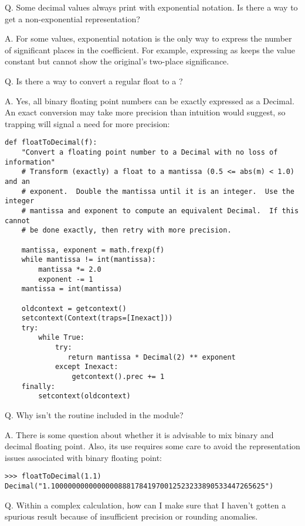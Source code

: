 Q.  Some decimal values always print with exponential notation.  Is there
a way to get a non-exponential representation?

A.  For some values, exponential notation is the only way to express
the number of significant places in the coefficient.  For example,
expressing  as  keeps the value
constant but cannot show the original's two-place significance.


Q.  Is there a way to convert a regular float to a ?

A.  Yes, all binary floating point numbers can be exactly expressed as a
Decimal.  An exact conversion may take more precision than intuition would
suggest, so trapping  will signal a need for more precision:

\begin{verbatim}
def floatToDecimal(f):
    "Convert a floating point number to a Decimal with no loss of information"
    # Transform (exactly) a float to a mantissa (0.5 <= abs(m) < 1.0) and an
    # exponent.  Double the mantissa until it is an integer.  Use the integer
    # mantissa and exponent to compute an equivalent Decimal.  If this cannot
    # be done exactly, then retry with more precision.

    mantissa, exponent = math.frexp(f)
    while mantissa != int(mantissa):
        mantissa *= 2.0
        exponent -= 1
    mantissa = int(mantissa)

    oldcontext = getcontext()
    setcontext(Context(traps=[Inexact]))
    try:
        while True:
            try:
               return mantissa * Decimal(2) ** exponent
            except Inexact:
                getcontext().prec += 1
    finally:
        setcontext(oldcontext)
\end{verbatim}


Q.  Why isn't the  routine included in the module?

A.  There is some question about whether it is advisable to mix binary and
decimal floating point.  Also, its use requires some care to avoid the
representation issues associated with binary floating point:

\begin{verbatim}
>>> floatToDecimal(1.1)
Decimal("1.100000000000000088817841970012523233890533447265625")
\end{verbatim}


Q.  Within a complex calculation, how can I make sure that I haven't gotten a
spurious result because of insufficient precision or rounding anomalies.

